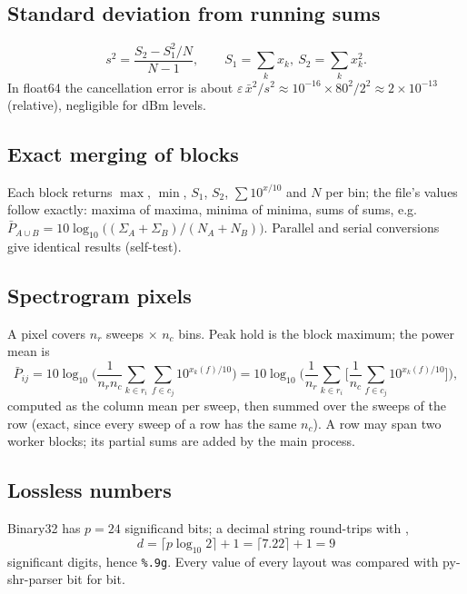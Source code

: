 \documentclass[11pt,a4paper]{article}
\newcommand{\code}[1]{\texttt{#1}}
\begin{document}
\subsection{Standard deviation from running sums}
\begin{equation}s^2=\frac{S_2-S_1^2/N}{N-1},\qquad S_1=\sum_k x_k,\ S_2=\sum_k x_k^2 .\end{equation}
In float64 the cancellation error is about $\varepsilon\,\bar x^2/s^2\approx 10^{-16}\times 80^2/2^2\approx
2\times10^{-13}$ (relative), negligible for dBm levels.
\subsection{Exact merging of blocks}
Each block returns $\max$, $\min$, $S_1$, $S_2$, $\sum 10^{x/10}$ and $N$ per bin; the file's values follow
exactly: maxima of maxima, minima of minima, sums of sums, e.g.
$\bar P_{A\cup B}=10\log_{10}\big((\Sigma_A+\Sigma_B)/(N_A+N_B)\big)$. Parallel and serial conversions give
identical results (self-test).
\subsection{Spectrogram pixels}
A pixel covers $n_r$ sweeps $\times$ $n_c$ bins. Peak hold is the block maximum; the power mean is
\begin{equation}
\bar P_{ij}=10\log_{10}\Big(\frac{1}{n_r n_c}\sum_{k\in r_i}\sum_{f\in c_j}10^{x_k(f)/10}\Big)
=10\log_{10}\Big(\frac{1}{n_r}\sum_{k\in r_i}\Big[\frac1{n_c}\sum_{f\in c_j}10^{x_k(f)/10}\Big]\Big),
\end{equation}
computed as the column mean per sweep, then summed over the sweeps of the row (exact, since every sweep of a
row has the same $n_c$). A row may span two worker blocks; its partial sums are added by the main process.
\subsection{Lossless numbers}
Binary32 has $p=24$ significand bits; a decimal string round-trips with \cite{r5},\cite{r12}
\begin{equation}d=\lceil p\log_{10}2\rceil+1=\lceil 7.22\rceil+1=9\end{equation}
significant digits, hence \code{\%.9g}. Every value of every layout was compared with py-shr-parser bit for bit.
\end{document}
